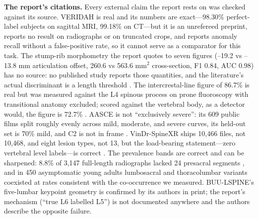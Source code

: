 \documentclass[11pt,letterpaper]{article}
\begin{document}
\textbf{The report's citations.} Every external claim the report rests on was checked against its source. VERIDAH \citep{veridah2026} is real and its numbers are exact---98.30\% perfect-label subjects on sagittal MRI, 99.18\% on CT---but it is an unrefereed preprint, reports no result on radiographs or on truncated crops, and reports anomaly recall without a false-positive rate, so it cannot serve as a comparator for this task. The stump-rib morphometry the report quotes to seven figures (--19.2 vs --13.8 mm articulation offset, 260.6 vs 563.6 mm$^2$ cross-section, F1 0.84, AUC 0.98) has no source: no published study reports those quantities, and the literature's actual discriminant is a length threshold \citep{konin2010}. The intercrestal-line figure of 86.7\% is real \citep{chakraverty2007} but was measured against the L4 spinous process on prone fluoroscopy with transitional anatomy excluded; scored against the vertebral body, as a detector would, the figure is 72.7\% \citep{walsh2006}. AASCE is not ``exclusively severe'': its 609 public films split roughly evenly across mild, moderate, and severe curves, its held-out set is 70\% mild, and C2 is not in frame \citep{aasce2021}. VinDr-SpineXR ships 10,466 files, not 10,468, and eight lesion types, not 13, but the load-bearing statement---zero vertebral level labels---is correct \citep{vindr}. The prevalence bands are correct and can be sharpened: 8.8\% of 3,147 full-length radiographs lacked 24 presacral segments \citep{sabri2025}, and in 450 asymptomatic young adults lumbosacral and thoracolumbar variants coexisted at rates \citep{jung2024} consistent with the co-occurrence we measured. BUU-LSPINE's five-lumbar keypoint geometry is confirmed by its authors in print; the report's mechanism (``true L6 labelled L5'') is not documented anywhere and the authors describe the opposite failure.
\end{document}
